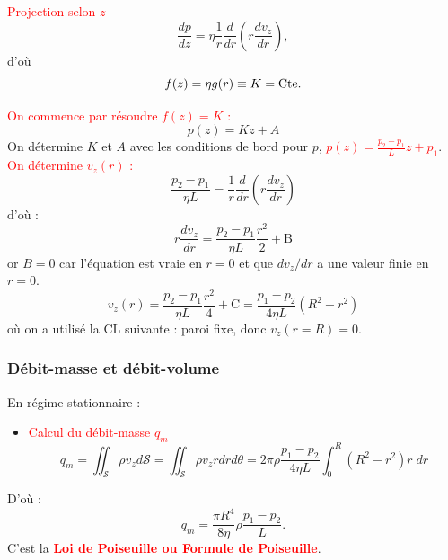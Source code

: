 \documentclass[11pt,a4paper]{report}
\begin{document}
\textcolor{red}{Projection selon $z$}
\begin{equation}
	\frac{dp}{dz} = \eta \frac{1}{r}\frac{d}{d r}\left(r \frac{d v_z}{d r}\right),
\end{equation}
d'où
\begin{equation}
	f(z) = \eta g(r) \equiv K = \text{Cte}.\\
\end{equation}

\textcolor{red}{On commence par résoudre $f(z) = K$ :}
\begin{equation}
	p(z) = Kz + A
\end{equation}
On détermine $K$ et $A$ avec les conditions de bord pour $p$, \textcolor{red}{$p(z) = \frac{p_2 - p_1}{L}z + p_1$}.\\

\textcolor{red}{On détermine $v_z(r)$ :}
\begin{equation}
	\frac{p_2 - p_1}{\eta L} = \frac{1}{r}\frac{d}{d r}\left(r \frac{d v_z}{d r}\right)
\end{equation}
d'où :
\begin{equation}
	r\frac{dv_z}{dr} = \frac{p_2-p_1}{\eta L} \frac{r^2}{2} + \text{B}
\end{equation}
or $B = 0$ car l'équation est vraie en $r = 0$ et que $dv_z/dr$ a une valeur finie en $r = 0$.
\begin{equation}
	v_z(r) = \frac{p_2-p_1}{\eta L}\frac{r^2}{4} + \text{C} = \frac{p_1-p_2}{4\eta L}\left(R^2 - r^2\right)
\end{equation}
où on a utilisé la CL suivante : paroi fixe, donc $v_z (r=R) = 0$.

\subsubsection{Débit-masse et débit-volume}

En régime stationnaire :
\begin{itemize}
	\item \textcolor{red}{Calcul du débit-masse $q_m$}
	\begin{equation}
		q_m = \iint_\mathcal{S} \rho v_z d\mathcal{S} = \iint_\mathcal{S}\rho v_z rdrd\theta = 2\pi\rho\frac{p_1-p_2}{4\eta L}\int_0^R (R^2-r^2)r \;dr
	\end{equation}
\end{itemize}
D'où :
\begin{equation}
	q_m = \frac{\pi R^4}{8\eta}\rho\frac{p_1-p_2}{L}.
\end{equation}
C'est la \textcolor{red}{\textbf{Loi de Poiseuille ou Formule de Poiseuille}}.\\
\end{document}
